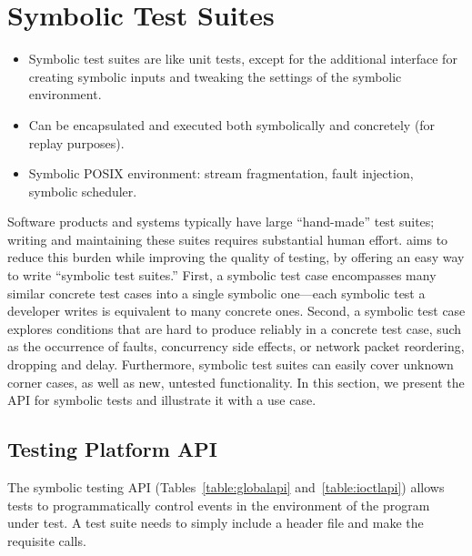 \section{Symbolic Test Suites}

\begin{itemize}
\item Symbolic test suites are like unit tests, except for the additional interface for creating symbolic inputs and tweaking the settings of the symbolic environment.
\item Can be encapsulated and executed both symbolically and concretely (for replay purposes).
\item Symbolic POSIX environment: stream fragmentation, fault injection, symbolic scheduler.
\end{itemize}

Software products and systems typically have large ``hand-made'' test suites; writing and maintaining these suites
requires substantial human effort.  \cnine aims to reduce this burden while improving the quality of testing, by offering
an easy way to write ``symbolic test suites.'' First, a symbolic test case encompasses many similar concrete test cases
into a single symbolic one---each symbolic test a developer writes is equivalent to many concrete ones.  Second, a
symbolic test case explores conditions that are hard to produce reliably in a concrete test case, such as the occurrence
of faults, concurrency side effects, or network packet reordering, dropping and delay.  Furthermore, symbolic test
suites can easily cover unknown corner cases, as well as new, untested functionality.  In this section, we present the
API for symbolic tests and illustrate it with a use case.

\subsection{Testing Platform API}

The \cnine symbolic testing API (Tables~\ref{table:globalapi} and~\ref{table:ioctlapi}) allows tests to programmatically control events in the environment of the program under test.  A test suite needs to simply include a  header file and make the requisite calls.

